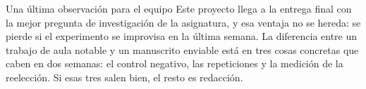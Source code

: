 \documentclass[11pt,a4paper]{article}
\begin{document}
\vspace{8pt}
\begin{aviso}{Una última observación para el equipo}
	Este proyecto llega a la entrega final con la mejor pregunta de investigación de la asignatura, y esa ventaja no se hereda: se pierde si el experimento se improvisa en la última semana. La diferencia entre un trabajo de aula notable y un manuscrito enviable está en tres cosas concretas que caben en dos semanas: el control negativo, las repeticiones y la medición de la reelección. Si esas tres salen bien, el resto es redacción.
\end{aviso}

\nocite{*}


\end{document}

